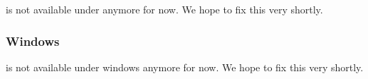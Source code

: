 \uwebots{} is not available under \macosx{} anymore for now. We hope to
fix this very shortly.




\subsubsection{Windows}

\uwebots{} is not available under windows anymore for now. We hope to
fix this very shortly.





